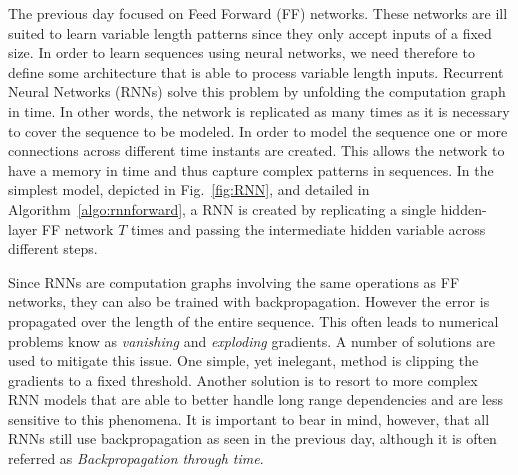 The previous day focused on Feed Forward (FF) networks. These networks are ill
suited to learn variable length patterns since they only accept inputs of a
fixed size. In order to learn sequences using neural networks, we need therefore
to define some architecture that is able to process variable length inputs.
Recurrent Neural Networks (RNNs) solve this problem by unfolding the
computation graph in time. In other words, the network is replicated as many
times as it is necessary to cover the sequence to be modeled. In order
to model the sequence one or more connections across different time instants are
created. This allows the network to have a memory in time and thus capture
complex patterns in sequences. In the simplest model, depicted in
Fig.~\ref{fig:RNN}, and detailed in Algorithm~\ref{algo:rnnforward}, a RNN is
created by replicating a single hidden-layer FF network $T$ times and passing
the intermediate hidden variable across different steps. 

Since RNNs are computation graphs involving the same operations as FF networks,
they can also be trained with backpropagation. However the error is
 propagated over the length of the entire sequence. This often leads to 
numerical problems know as \textit{vanishing} and \textit{exploding} gradients.
A number of solutions are used to mitigate this issue. One simple, yet inelegant,
method is clipping the gradients to a fixed threshold. Another solution is to resort to more complex 
RNN models that are able to better handle long range dependencies and are less
sensitive to this phenomena. It is important to bear in mind, however, that
all RNNs still use backpropagation as seen in the previous day, although it is
often referred as \textit{Backpropagation through time}. 


